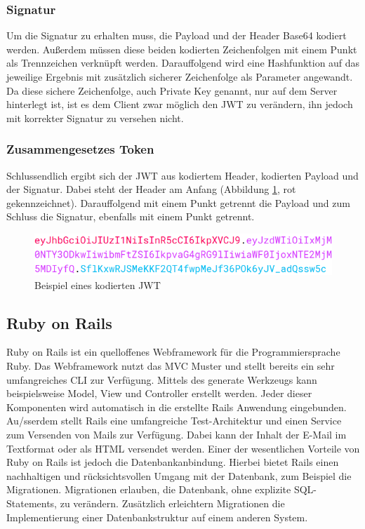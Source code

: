 \subsubsection{Signatur}
\label{sec: jwt_signature}

Um die Signatur zu erhalten muss, die Payload und der Header Base64 kodiert werden. Au{\ss}erdem müssen diese beiden kodierten Zeichenfolgen mit einem Punkt als Trennzeichen verknüpft werden. Darauffolgend wird eine Hashfunktion auf das jeweilige Ergebnis mit zusätzlich sicherer Zeichenfolge als Parameter angewandt. Da diese sichere Zeichenfolge, auch Private Key genannt, nur auf dem Server hinterlegt ist, ist es dem Client zwar möglich den \gls{JWT} zu verändern, ihn jedoch mit korrekter Signatur zu versehen nicht.

\subsubsection{Zusammengesetzes Token}
\label{sec: jwt_result}
Schlussendlich ergibt sich der \gls{JWT} aus kodiertem Header, kodierten Payload und der Signatur. Dabei steht der Header am Anfang (Abbildung \ref{fig:jwt-encoded}, rot gekennzeichnet). Darauffolgend mit einem Punkt getrennt die Payload und zum Schluss die Signatur, ebenfalls mit einem Punkt getrennt.

\begin{figure}[h]
	\centering
	\includegraphics[width=\linewidth]{graphics/jwt-encoded.png}
	\caption{Beispiel eines kodierten \gls{JWT} }
	\label{fig:jwt-encoded}
\end{figure}

\subsection{Ruby on Rails}
\label{sec: rails}
Ruby on Rails ist ein quelloffenes Webframework für die Programmiersprache Ruby. Das Webframework nutzt das \gls{MVC} Muster und stellt bereits ein sehr umfangreiches \gls{CLI} zur Verfügung. Mittels des generate Werkzeugs kann beispielsweise Model, View und Controller erstellt werden. Jeder dieser Komponenten wird automatisch in die erstellte Rails Anwendung eingebunden. Au{/ss}erdem stellt Rails eine umfangreiche Test-Architektur und einen Service zum Versenden von Mails zur Verfügung. Dabei kann der Inhalt der E-Mail im Textformat oder als \gls{HTML} versendet werden. Einer der wesentlichen Vorteile von Ruby on Rails ist jedoch die Datenbankanbindung. Hierbei bietet Rails einen nachhaltigen und rücksichtsvollen Umgang mit der Datenbank, zum Beispiel die Migrationen. Migrationen erlauben, die Datenbank, ohne explizite SQL-Statements, zu verändern. Zusätzlich erleichtern Migrationen die Implementierung einer Datenbankstruktur auf einem anderen System.

